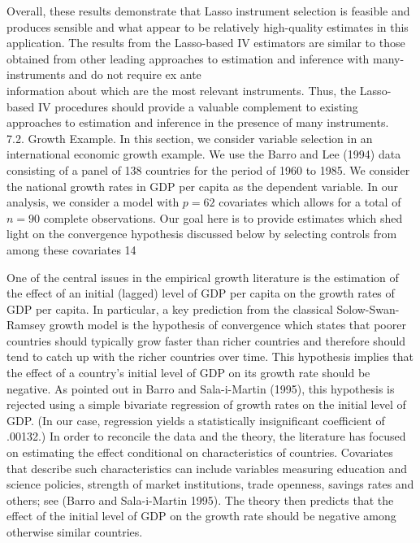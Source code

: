 \documentclass[10pt]{article}
\begin{document}
Overall, these results demonstrate that Lasso instrument selection is feasible and produces sensible and what appear to be relatively high-quality estimates in this application. The results from the Lasso-based IV estimators are similar to those obtained from other leading approaches to estimation and inference with many-instruments and do not require ex ante\\
information about which are the most relevant instruments. Thus, the Lasso-based IV procedures should provide a valuable complement to existing approaches to estimation and inference in the presence of many instruments.\\
7.2. Growth Example. In this section, we consider variable selection in an international economic growth example. We use the Barro and Lee (1994) data consisting of a panel of 138 countries for the period of 1960 to 1985. We consider the national growth rates in GDP per capita as the dependent variable. In our analysis, we consider a model with \(p=62\) covariates which allows for a total of \(n=90\) complete observations. Our goal here is to provide estimates which shed light on the convergence hypothesis discussed below by selecting controls from among these covariates 14

One of the central issues in the empirical growth literature is the estimation of the effect of an initial (lagged) level of GDP per capita on the growth rates of GDP per capita. In particular, a key prediction from the classical Solow-Swan-Ramsey growth model is the hypothesis of convergence which states that poorer countries should typically grow faster than richer countries and therefore should tend to catch up with the richer countries over time. This hypothesis implies that the effect of a country's initial level of GDP on its growth rate should be negative. As pointed out in Barro and Sala-i-Martin (1995), this hypothesis is rejected using a simple bivariate regression of growth rates on the initial level of GDP. (In our case, regression yields a statistically insignificant coefficient of .00132.) In order to reconcile the data and the theory, the literature has focused on estimating the effect conditional on characteristics of countries. Covariates that describe such characteristics can include variables measuring education and science policies, strength of market institutions, trade openness, savings rates and others; see (Barro and Sala-i-Martin 1995). The theory then predicts that the effect of the initial level of GDP on the growth rate should be negative among otherwise similar countries.
\end{document}
